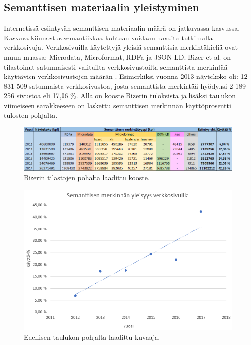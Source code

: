 \documentclass[finnish, 12pt, a4paper, elec, utf8, pdfa, online]{aaltothesis}
\begin{document}
{\subsection{Semanttisen materiaalin yleistyminen}
Internetissä esiintyvän semanttisen materiaalin määrä on jatkuvassa kasvussa. Kasvava kiinnostus semantiikkaa kohtaan voidaan havaita tutkimalla verkkosivuja. Verkkosivuilla käytettyjä yleisiä semanttisia merkintäkieliä ovat muun muassa: Microdata, Microformat, RDFa ja JSON-LD. Bizer et al. on tilastoinut satunnaisesti valituilta verkkosivustoilta semanttista merkintää käyttävien verkkosivustojen määrän \cite{rdfa_usage}. Esimerkiksi vuonna 2013 näytekoko oli: 12 831 509 satunnaista verkkosivustoa, josta semanttista merkintää hyödynsi 2 189 256 sivustoa eli 17,06 \%. Alla on kooste Bizerin tuloksista ja lisäksi taulukon viimeiseen sarakkeeseen on laskettu semanttisen merkinnän käyttöprosentti tulosten pohjalta.

\begin{figure}[htb]
\centering
\includegraphics[width=15cm]{images/taulukko.png}
\caption{Bizerin tilastojen pohalta laadittu kooste. \label{images/taulukko2}}
\end{figure}

\begin{figure}[htb]
\centering
\includegraphics[width=13cm]{images/verkkosivut.png}
\caption{Edellisen taulukon pohjalta laadittu kuvaaja. \label{images/verkkosivut}}
\end{figure}

}
\end{document}

